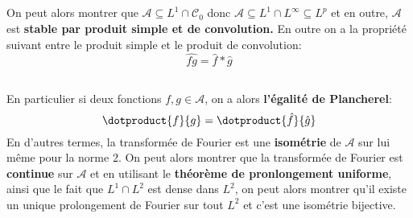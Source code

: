 \subsection*{}
On peut alors montrer que \( \mathscr{A} \subseteq L^1 \cap \mathcal{C}_0 \) donc \( \mathscr{A} \subseteq L^1 \cap L^\infty \subseteq L^p \) et en outre, \( \mathscr{A} \) est \textbf{stable par produit simple et de convolution.} En outre on a la propriété suivant entre le produit simple et le produit de convolution:
\[ 
   \hat{fg} = \hat{f}*\hat{g} 
\]

\subsection*{}
En particulier si deux fonctions \( f, g \in \mathscr{A} \), on a alors \textbf{l'égalité de Plancherel}:
\[ 
   \dotproduct{f}{g} =  \dotproduct{\hat{f}}{\hat{g}}
\]
En d'autres termes, la transformée de Fourier est une \textbf{isométrie} de \( \mathscr{A} \) sur lui même pour la norme 2. On peut alors montrer que la transformée de Fourier est \textbf{continue} sur \( \mathscr{A} \) et en utilisant le \textbf{théorème de pronlongement uniforme}, ainsi que le fait que \( L^1 \cap L^2 \) est dense dans \( L^2 \), on peut alors montrer qu'il existe un unique prolongement de Fourier sur tout \( L^2 \) et c'est une isométrie bijective.
